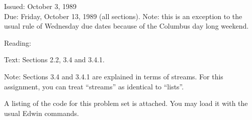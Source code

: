 % 
% 
% 
% 
% 
% 







\medskip

\begin{flushleft}
Issued:  October 3, 1989 \\
\smallskip
 Due: Friday, October 13, 1989 (all sections).  Note: this is an
exception to the usual rule of Wednesday due dates because of the
Columbus day long weekend.

\end{flushleft}

\noindent
Reading: 
\begin{tightlist}

\item Text: Sections 2.2, 3.4 and 3.4.1.

Note: Sections 3.4 and 3.4.1 are explained in terms of streams.  For this
assignment, you can treat ``streams'' as identical to ``lists''.

\item A listing of the code for this problem set is attached.
You may load it with the usual Edwin commands.

\end{tightlist}


